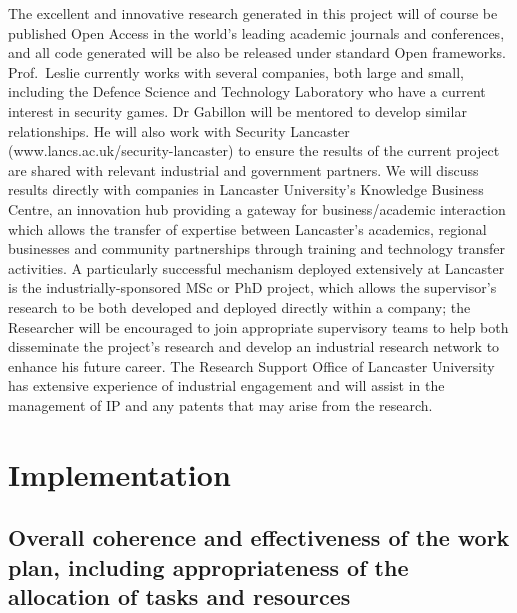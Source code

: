 \documentclass[a4paper,11pt]{article}
\newcommand{\TODO}[1]{{\textcolor{red}{[\textbf{TODO:} #1]}}}
\begin{document}
The excellent and innovative research generated in this project will of course be published Open Access in the world's leading academic journals and conferences, and all code generated will be also be released under standard Open frameworks.  Prof.\ Leslie currently works with several companies, both large and small, including the Defence Science and Technology Laboratory who have a current interest in security games. Dr Gabillon will be mentored to develop similar relationships.  He will also work with Security Lancaster (www.lancs.ac.uk/security-lancaster) to ensure the results of the current project are shared with relevant industrial and government partners.  We will discuss results directly with companies in Lancaster University's Knowledge Business Centre, an innovation hub providing a gateway for business/academic interaction which allows the transfer of expertise between Lancaster's academics, regional businesses and community partnerships through training and technology transfer activities.  A particularly successful mechanism deployed extensively at Lancaster is the industrially-sponsored MSc or PhD project, which allows the supervisor's research to be both developed and deployed directly within a company; the Researcher will be encouraged to join appropriate supervisory teams to help both disseminate the project's research and develop an industrial research network to enhance his future career.  The Research Support Office of Lancaster University has extensive experience of industrial engagement and will assist in the management of IP and any patents that may arise from the research.

\section{Implementation}
\label{sec:implementation}


\subsection{Overall coherence and effectiveness of the work plan, including appropriateness of the allocation of tasks and resources}
\end{document}
